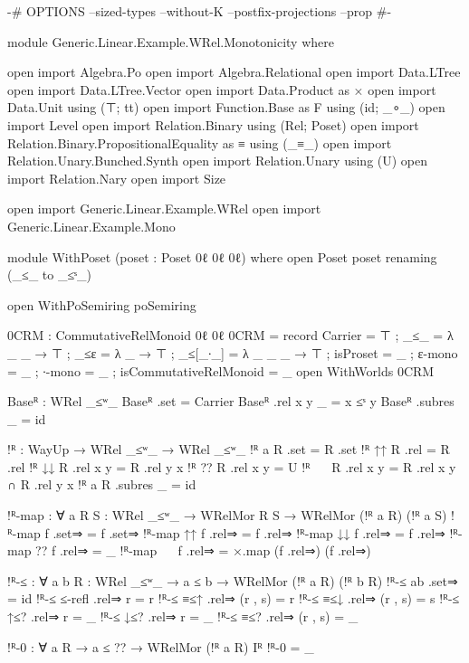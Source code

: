 \begin{code}
{-# OPTIONS --sized-types --without-K --postfix-projections --prop #-}

module Generic.Linear.Example.WRel.Monotonicity where

  open import Algebra.Po
  open import Algebra.Relational
  open import Data.LTree
  open import Data.LTree.Vector
  open import Data.Product as ×
  open import Data.Unit using (⊤; tt)
  open import Function.Base as F using (id; _∘_)
  open import Level
  open import Relation.Binary using (Rel; Poset)
  open import Relation.Binary.PropositionalEquality as ≡ using (_≡_)
  open import Relation.Unary.Bunched.Synth
  open import Relation.Unary using (U)
  open import Relation.Nary
  open import Size

  open import Generic.Linear.Example.WRel
  open import Generic.Linear.Example.Mono

  module WithPoset (poset : Poset 0ℓ 0ℓ 0ℓ) where
    open Poset poset renaming (_≤_ to _≤ˢ_)

    open WithPoSemiring poSemiring

    0CRM : CommutativeRelMonoid 0ℓ 0ℓ
    0CRM = record
      { Carrier = ⊤
      ; _≤_ = λ _ _ → ⊤
      ; _≤ε = λ _ → ⊤
      ; _≤[_∙_] = λ _ _ _ → ⊤
      ; isProset = _
      ; ε-mono = _
      ; ∙-mono = _
      ; isCommutativeRelMonoid = _
      }
    open WithWorlds 0CRM

    Baseᴿ : WRel _≤ʷ_
    Baseᴿ .set = Carrier
    Baseᴿ .rel x y _ = x ≤ˢ y
    Baseᴿ .subres _ = id

    !ᴿ : WayUp → WRel _≤ʷ_ → WRel _≤ʷ_
    !ᴿ a R .set = R .set
    !ᴿ ↑↑ R .rel = R .rel
    !ᴿ ↓↓ R .rel x y = R .rel y x
    !ᴿ ?? R .rel x y = U
    !ᴿ ~~ R .rel x y = R .rel x y ∩ R .rel y x
    !ᴿ a R .subres _ = id

    !ᴿ-map : ∀ {a} {R S : WRel _≤ʷ_} → WRelMor R S → WRelMor (!ᴿ a R) (!ᴿ a S)
    !ᴿ-map f .set⇒ = f .set⇒
    !ᴿ-map {↑↑} f .rel⇒ = f .rel⇒
    !ᴿ-map {↓↓} f .rel⇒ = f .rel⇒
    !ᴿ-map {??} f .rel⇒ = _
    !ᴿ-map {~~} f .rel⇒ = ×.map (f .rel⇒) (f .rel⇒)

    !ᴿ-≤ : ∀ {a b} {R : WRel _≤ʷ_} → a ≤ b → WRelMor (!ᴿ a R) (!ᴿ b R)
    !ᴿ-≤ ab .set⇒ = id
    !ᴿ-≤ ≤-refl .rel⇒ r = r
    !ᴿ-≤ ≡≤↑ .rel⇒ (r , s) = r
    !ᴿ-≤ ≡≤↓ .rel⇒ (r , s) = s
    !ᴿ-≤ ↑≤? .rel⇒ r = _
    !ᴿ-≤ ↓≤? .rel⇒ r = _
    !ᴿ-≤ ≡≤? .rel⇒ (r , s) = _

    !ᴿ-0 : ∀ {a R} → a ≤ ?? → WRelMor (!ᴿ a R) Iᴿ
    !ᴿ-0 = _


\end{code}
